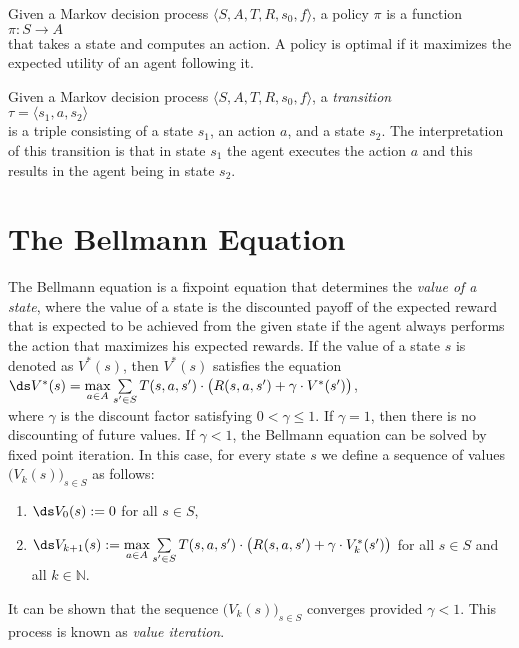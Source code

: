 \begin{Definition}[Policy]
  Given a Markov decision process $\langle S, A, T, R, s_0, f \rangle$, a policy $\pi$ is a function
  \\[0.2cm]
  \hspace*{1.3cm}
  $\pi: S \rightarrow A$
  \\[0.2cm]
  that takes a state and computes an action.  A policy is optimal if it maximizes the expected
  utility of an agent following it.
\end{Definition}

\begin{Definition}[Transition]
  Given a Markov decision process $\langle S, A, T, R, s_0, f \rangle$, a \emph{transition} 
  \\[0.2cm]
  \hspace*{1.3cm}
  $\tau = \langle s_1, a, s_2 \rangle$ 
  \\[0.2cm]
  is a triple consisting of a state $s_1$, an action $a$, and a state $s_2$.  The interpretation of
  this transition is that in state $s_1$ the agent executes the action $a$ and this results in the
  agent being in state $s_2$. \eox
\end{Definition}

\section{The Bellmann Equation}
The Bellmann equation is a fixpoint equation that determines the \emph{value of a state}, where the
value of a state is the discounted payoff of the expected reward that is expected to be achieved
from the given state if the agent always performs the action that maximizes his expected rewards.
If the value of a state $s$ is denoted as $V^*(s)$, then $V^*(s)$ satisfies the equation
\\[0.2cm]
\hspace*{1.3cm}
$\ds V^*(s) = \max\limits_{a \in A} \sum\limits_{s' \in S} T(s,a,s') \cdot \bigl(R(s,a,s') + \gamma \cdot V^*(s')\bigr)$,
\\[0.2cm]
where $\gamma$ is the discount factor satisfying $0 < \gamma \leq 1$.  If $\gamma = 1$, then there
is no discounting of future values.  If $\gamma < 1$, the Bellmann equation can be solved by fixed
point iteration.  In this case, for every state $s$ we define a sequence of values
$\bigl(V_k(s)\bigr)_{s\in S}$ as follows:
\begin{enumerate}
\item $\ds V_0(s) := 0$ for all $s \in S$,
\item $\ds V_{k+1}(s) := \max\limits_{a \in A} \sum\limits_{s' \in S} T(s,a,s') \cdot \bigl(R(s,a,s') + \gamma \cdot V_k^*(s')\bigr)$ 
      for all $s \in S$ and all $k \in \mathbb{N}$.
\end{enumerate}
It can be shown that the sequence $\bigl(V_k(s)\bigr)_{s\in S}$ converges provided $\gamma < 1$.
This process is known as \emph{value iteration}.

